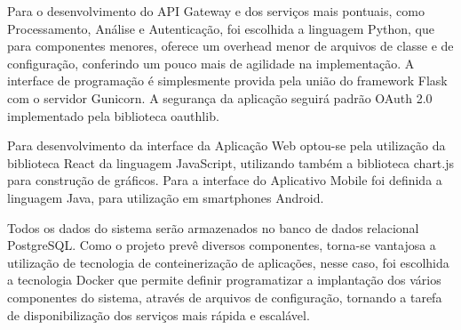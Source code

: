 Para o desenvolvimento do API Gateway e dos serviços mais pontuais, como Processamento, Análise e Autenticação, foi escolhida a linguagem Python, que para componentes menores, oferece um overhead menor de arquivos de classe e de configuração, conferindo um pouco mais de agilidade na implementação. A interface de programação é simplesmente provida pela união do framework Flask com o servidor Gunicorn. A segurança da aplicação seguirá padrão OAuth 2.0 implementado pela biblioteca oauthlib.


Para desenvolvimento da interface da Aplicação Web optou-se pela utilização da biblioteca React da linguagem JavaScript, utilizando também a biblioteca chart.js para construção de gráficos. Para a interface do Aplicativo Mobile foi definida a linguagem Java, para utilização em smartphones Android. 


Todos os dados do sistema serão armazenados no banco de dados relacional PostgreSQL. Como o projeto prevê diversos componentes, torna-se vantajosa a utilização de tecnologia de conteinerização de aplicações, nesse caso, foi escolhida a tecnologia Docker que permite definir programatizar a implantação dos vários componentes do sistema, através de arquivos de configuração, tornando a tarefa de disponibilização dos serviços mais rápida e escalável.


